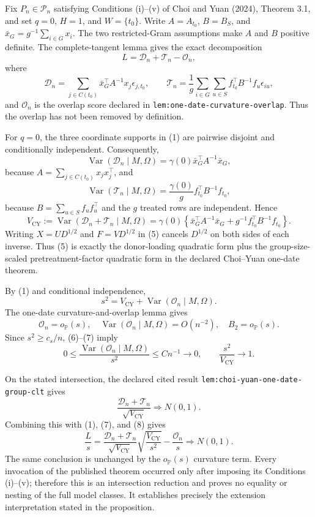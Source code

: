 Fix \(P_n\in\mathcal P_n\) satisfying Conditions (i)--(v) of Choi and Yuan (2024), Theorem 3.1, and set \(q=0\), \(H=1\), and \(W=\{t_0\}\).  Write \(A=A_{t_0}\), \(B=B_S\), and \(\bar x_G=g^{-1}\sum_{i\in G}x_i\).  The two restricted-Gram assumptions make \(A\) and \(B\) positive definite.  The complete-tangent lemma gives the exact decomposition
\[
 L=\mathcal D_n+\mathcal T_n-\mathcal O_n,
 \tag{1}
\]
where
\[
 \mathcal D_n=\sum_{j\in C(t_0)}\bar x_G^{\top}A^{-1}x_j\epsilon_{j,t_0},
 \qquad
 \mathcal T_n=\frac1g\sum_{i\in G}\sum_{u\in S}
 f_{t_0}^{\top}B^{-1}f_u\epsilon_{iu},
 \tag{2}
\]
and \(\mathcal O_n\) is the overlap score declared in \texttt{lem:one-date-curvature-overlap}.  Thus the overlap has not been removed by definition.

For \(q=0\), the three coordinate supports in (1) are pairwise disjoint and conditionally independent.  Consequently,
\[
 \operatorname{Var}(\mathcal D_n\mid M,\Omega)
 =\gamma(0)\bar x_G^{\top}A^{-1}\bar x_G,
 \tag{3}
\]
because \(A=\sum_{j\in C(t_0)}x_jx_j^{\top}\), and
\[
 \operatorname{Var}(\mathcal T_n\mid M,\Omega)
 =\frac{\gamma(0)}g f_{t_0}^{\top}B^{-1}f_{t_0},
 \tag{4}
\]
because \(B=\sum_{u\in S}f_uf_u^{\top}\) and the \(g\) treated rows are independent.  Hence
\[
 V_{\mathrm{CY}}:=\operatorname{Var}(\mathcal D_n+\mathcal T_n\mid M,\Omega)
 =\gamma(0)\left\{\bar x_G^{\top}A^{-1}\bar x_G
 +g^{-1}f_{t_0}^{\top}B^{-1}f_{t_0}\right\}.
 \tag{5}
\]
Writing \(X=UD^{1/2}\) and \(F=VD^{1/2}\) in (5) cancels \(D^{1/2}\) on both sides of each inverse.  Thus (5) is exactly the donor-loading quadratic form plus the group-size-scaled pretreatment-factor quadratic form in the declared Choi--Yuan one-date theorem.

By (1) and conditional independence,
\[
 s^2=V_{\mathrm{CY}}+\operatorname{Var}(\mathcal O_n\mid M,\Omega).
 \tag{6}
\]
The one-date curvature-and-overlap lemma gives
\[
 \mathcal O_n=o_{\mathbb P}(s),
 \quad
 \operatorname{Var}(\mathcal O_n\mid M,\Omega)=O(n^{-2}),
 \quad B_2=o_{\mathbb P}(s).
 \tag{7}
\]
Since \(s^2\ge c_s/n\), (6)--(7) imply
\[
 0\le\frac{\operatorname{Var}(\mathcal O_n\mid M,\Omega)}{s^2}
 \le Cn^{-1}\to0,
 \qquad
 \frac{s^2}{V_{\mathrm{CY}}}\to1.
 \tag{8}
\]

On the stated intersection, the declared cited result \texttt{lem:choi-yuan-one-date-group-clt} gives
\[
 \frac{\mathcal D_n+\mathcal T_n}{\sqrt{V_{\mathrm{CY}}}}
 \Rightarrow N(0,1).
\]
Combining this with (1), (7), and (8) gives
\[
 \frac Ls
 =\frac{\mathcal D_n+\mathcal T_n}{\sqrt{V_{\mathrm{CY}}}}
   \sqrt{\frac{V_{\mathrm{CY}}}{s^2}}
  -\frac{\mathcal O_n}{s}
 \Rightarrow N(0,1).
\]
The same conclusion is unchanged by the \(o_{\mathbb P}(s)\) curvature term.  Every invocation of the published theorem occurred only after imposing its Conditions (i)--(v); therefore this is an intersection reduction and proves no equality or nesting of the full model classes.  It establishes precisely the extension interpretation stated in the proposition.

